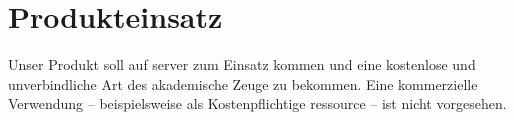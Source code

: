 \chapter{Produkteinsatz}

	Unser Produkt soll auf server zum Einsatz kommen und eine kostenlose und unverbindliche Art des akademische Zeuge zu bekommen. Eine kommerzielle Verwendung -- beispielsweise als Kostenpflichtige ressource -- ist nicht vorgesehen.
